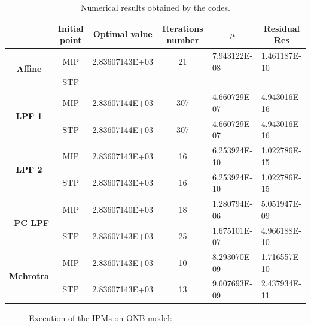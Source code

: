 \documentclass[a4paper,10 pt,titlepage,twoside]{book}
\theoremstyle{plain}
\theoremstyle{definition}
\theoremstyle{remark}
\begin{document}
{{\begin{table}[]\caption{\label{table:ONB}Numerical results obtained by the codes.}
	\begin{tabular}{cclcll}
		\hline		\textbf{} & \textbf{Initial point} & \multicolumn{1}{c}{\textbf{Optimal value}} & \textbf{Iterations number} & \multicolumn{1}{c}{\textbf{$\mu$}} & \multicolumn{1}{c}{\textbf{Residual} Res} \\ \hline
		\multicolumn{1}{c|}{\multirow{2}{*}{\textbf{Affine}}} & MIP & 2.83607143E+03 & 21 & 7.943122E-08 & 1.461187E-10 \\
		\multicolumn{1}{c|}{} & STP & - & - & - & - \\ \hline
		\multicolumn{1}{c|}{\multirow{2}{*}{\textbf{LPF 1}}} & MIP & 2.83607144E+03 & 307 & 4.660729E-07 & 4.943016E-16 \\
		\multicolumn{1}{c|}{} & STP & 2.83607144E+03 & 307 & 4.660729E-07 & 4.943016E-16 \\ \hline
		\multicolumn{1}{c|}{\multirow{2}{*}{\textbf{LPF 2}}} & MIP & 2.83607143E+03 & 16 & 6.253924E-10 & 1.022786E-15 \\
		\multicolumn{1}{c|}{} & STP & 2.83607143E+03 & 16 & 6.253924E-10 & 1.022786E-15 \\ \hline
		\multicolumn{1}{r|}{\multirow{2}{*}{\textbf{PC LPF}}} & MIP & 2.83607140E+03 & 18 & 1.280794E-06 & 5.051947E-09 \\
		\multicolumn{1}{r|}{} & STP & 2.83607143E+03 & 25 & 1.675101E-07 & 4.966188E-10 \\ \hline
		\multicolumn{1}{c|}{\multirow{2}{*}{\textbf{Mehrotra}}} & MIP & 2.83607143E+03 & 10 & 8.293070E-09 & 1.716557E-10 \\
		\multicolumn{1}{c|}{} & STP & 2.83607143E+03  & 13 & 9.607693E-09 & 2.437934E-11 \\ \hline
	\end{tabular}
\end{table}
\begin{figure}\caption{\label{figure:onb}Execution of the IPMs on ONB model:}
	 \qquad%

\end{figure}}}
\end{document}
